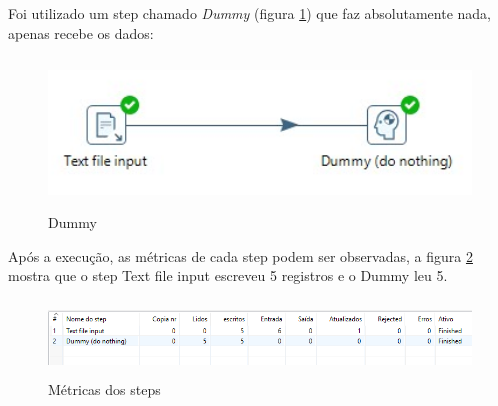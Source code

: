 Foi utilizado um step chamado \textit{Dummy} (figura \ref{dummy}) que faz absolutamente nada, apenas recebe os dados:
\begin{figure}[H]
\centering
\includegraphics[height=4cm]{imagens/example1.png}
\caption{Dummy}
\label{dummy}
\end{figure}
Após a execução, as métricas de cada step podem ser observadas, a figura \ref{metrics} mostra que o step Text file input escreveu 5 registros e o Dummy leu 5.
\begin{figure}[H]
\centering
\includegraphics[height=2cm]{imagens/metrics.png}
\caption{Métricas dos steps}
\label{metrics}
\end{figure}
\vfill
